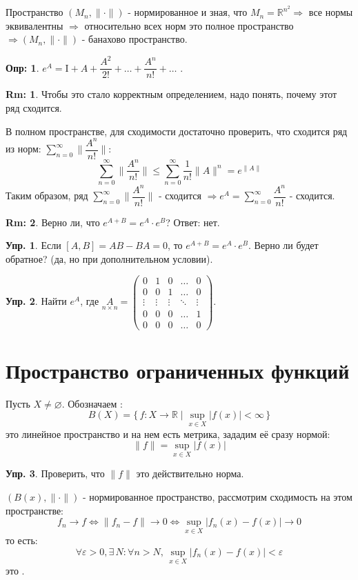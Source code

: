 \documentclass[12pt]{article}
\newcommand{\MR}{\mathbb{R}}
\newcommand{\MI}{\mathrm{I}}
\newcommand{\VN}{\varnothing}
\newcommand{\VE}{\varepsilon}
\theoremstyle{definition}
\newtheorem{defn}{Опр:}
\newtheorem{rem}{Rm:}
\newtheorem{exrc}{Упр.}
\begin{document}
Пространство $(M_n, \|\cdot\|)$ - нормированное и зная, что $M_n = \MR^{n^2} \Rightarrow $ все нормы эквивалентны  $\Rightarrow$ относительно всех норм это полное пространство $\Rightarrow (M_n, \|\cdot\|)$ - банахово пространство.

\begin{defn}
	$e^A = \MI + A + \dfrac{A^2}{2!} + \dotsc + \dfrac{A^n}{n!} + \dotsc $ .
\end{defn}
\begin{rem}
	Чтобы это стало корректным определением, надо понять, почему этот ряд сходится.
\end{rem}
В полном пространстве, для сходимости достаточно проверить, что сходится ряд из норм: $\displaystyle \sum\limits_{n = 0}^{\infty} \bigg\|\dfrac{A^n}{n!}\bigg\|$:
$$
	\sum\limits_{n = 0}^{\infty} \bigg\|\dfrac{A^n}{n!}\bigg\| \leq \sum\limits_{n = 0}^{\infty} \dfrac{1}{n!}\|A\|^n = e^{\|A\|}
$$
Таким образом, ряд $\displaystyle \sum\limits_{n = 0}^{\infty} \bigg\|\dfrac{A^n}{n!}\bigg\|$ - сходится $\Rightarrow e^A = \displaystyle \sum\limits_{n = 0}^{\infty} \dfrac{A^n}{n!}$ - сходится.

\begin{rem}
	Верно ли, что $e^{A + B} = e^A{\cdot}e^B$? Ответ: нет.
	
\end{rem}

\begin{exrc}
	Если $[A,B] = AB - BA = 0$, то $e^{A + B} = e^A{\cdot}e^B$. Верно ли будет обратное? (да, но при дополнительном условии).
\end{exrc}

\begin{exrc}
	Найти $e^A$, где $\underset{n \times n}{A} = \begin{pmatrix} 0 & 1 & 0 & \dotsc & 0 \\ 0 & 0 & 1 & \dotsc & 0 \\ \vdots & \vdots & \vdots & \ddots & \vdots \\ 0&0&0&\dotsc&1\\
	0& 0& 0&\dotsc &0  \end{pmatrix}$.
\end{exrc}

\newpage
\section*{Пространство ограниченных функций}
Пусть $X \neq \VN$. Обозначаем :
$$
	B(X) = \{\, f\colon X \to \MR \mid \sup\limits_{x \in X}|f(x)| < \infty\,\}
$$
это линейное пространство и на нем есть метрика, зададим её сразу нормой:
$$
	\|f\| = \sup\limits_{x \in X}|f(x)|
$$
\begin{exrc}
	Проверить, что $\|f\|$ это действительно норма.
\end{exrc}
$(B(x),\|\cdot\|)$ - нормированное пространство, рассмотрим сходимость на этом пространстве:
$$
	f_n \to f \Leftrightarrow \|f_n - f\| \to 0 \Leftrightarrow \sup\limits_{x \in X}|f_n(x) - f(x)| \to 0
$$
то есть: 
$$
	\forall \VE > 0, \exists \, N \colon \forall n > N, \, \sup\limits_{x \in X}|f_n(x) - f(x)| < \VE
$$
это .
\end{document}
